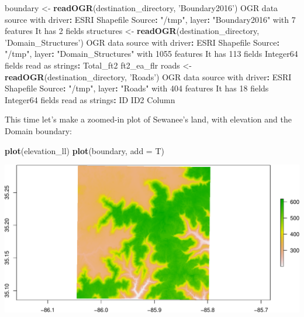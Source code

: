 \documentclass[]{book}
\newenvironment{Shaded}{\begin{snugshade}}{\end{snugshade}}
\newcommand{\DataTypeTok}[1]{\textcolor[rgb]{0.13,0.29,0.53}{#1}}
\newcommand{\DecValTok}[1]{\textcolor[rgb]{0.00,0.00,0.81}{#1}}
\newcommand{\KeywordTok}[1]{\textcolor[rgb]{0.13,0.29,0.53}{\textbf{#1}}}
\newcommand{\NormalTok}[1]{#1}
\newcommand{\OperatorTok}[1]{\textcolor[rgb]{0.81,0.36,0.00}{\textbf{#1}}}
\newcommand{\StringTok}[1]{\textcolor[rgb]{0.31,0.60,0.02}{#1}}
\begin{document}
\begin{Shaded}
\begin{Highlighting}[]
\NormalTok{boundary <-}\StringTok{ }\KeywordTok{readOGR}\NormalTok{(destination_directory, }\StringTok{'Boundary2016'}\NormalTok{)}
\NormalTok{OGR data source with driver}\OperatorTok{:}\StringTok{ }\NormalTok{ESRI Shapefile }
\NormalTok{Source}\OperatorTok{:}\StringTok{ "/tmp"}\NormalTok{, layer}\OperatorTok{:}\StringTok{ "Boundary2016"}
\NormalTok{with }\DecValTok{7}\NormalTok{ features}
\NormalTok{It has }\DecValTok{2}\NormalTok{ fields}
\NormalTok{structures <-}\StringTok{ }\KeywordTok{readOGR}\NormalTok{(destination_directory, }\StringTok{'Domain_Structures'}\NormalTok{)}
\NormalTok{OGR data source with driver}\OperatorTok{:}\StringTok{ }\NormalTok{ESRI Shapefile }
\NormalTok{Source}\OperatorTok{:}\StringTok{ "/tmp"}\NormalTok{, layer}\OperatorTok{:}\StringTok{ "Domain_Structures"}
\NormalTok{with }\DecValTok{1055}\NormalTok{ features}
\NormalTok{It has }\DecValTok{113}\NormalTok{ fields}
\NormalTok{Integer64 fields read as strings}\OperatorTok{:}\StringTok{  }\NormalTok{Total_ft2 ft2_ea_flr }
\NormalTok{roads <-}\StringTok{ }\KeywordTok{readOGR}\NormalTok{(destination_directory, }\StringTok{'Roads'}\NormalTok{)}
\NormalTok{OGR data source with driver}\OperatorTok{:}\StringTok{ }\NormalTok{ESRI Shapefile }
\NormalTok{Source}\OperatorTok{:}\StringTok{ "/tmp"}\NormalTok{, layer}\OperatorTok{:}\StringTok{ "Roads"}
\NormalTok{with }\DecValTok{404}\NormalTok{ features}
\NormalTok{It has }\DecValTok{18}\NormalTok{ fields}
\NormalTok{Integer64 fields read as strings}\OperatorTok{:}\StringTok{  }\NormalTok{ID ID2 Column }
\end{Highlighting}
\end{Shaded}

This time let's make a zoomed-in plot of Sewanee's land, with elevation and the Domain boundary:

\begin{Shaded}
\begin{Highlighting}[]
\KeywordTok{plot}\NormalTok{(elevation_ll)}
\KeywordTok{plot}\NormalTok{(boundary, }\DataTypeTok{add =}\NormalTok{ T)}
\end{Highlighting}
\end{Shaded}

\includegraphics{figures/unnamed-chunk-654-1.pdf}
\end{document}
